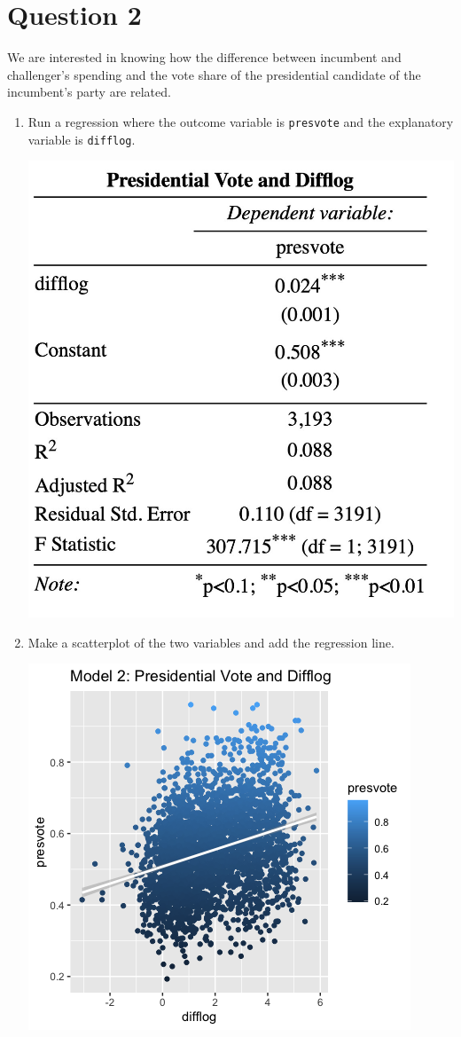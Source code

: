 \documentclass[12pt,letterpaper]{article}
\begin{document}
\section*{Question 2}
\noindent We are interested in knowing how the difference between incumbent and challenger's spending and the vote share of the presidential candidate of the incumbent's party are related.	\vspace{.25cm}
	\begin{enumerate}
		\item Run a regression where the outcome variable is \texttt{presvote} and the explanatory variable is \texttt{difflog}.
			 
		\includegraphics[width=.8\textwidth]{model_2.jpg}
			\vspace{5cm}
		
		\item Make a scatterplot of the two variables and add the regression line. 	
		\vspace{.5cm}
		
		 
		\centering
		\includegraphics[width=.8\textwidth]{plot2.png}
		\vspace{.5cm}


\end{enumerate}
\end{document}
